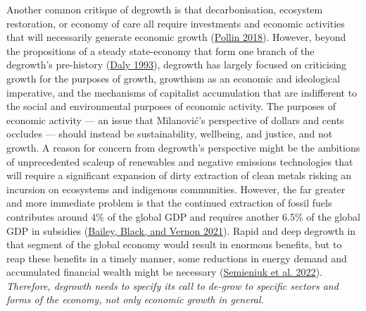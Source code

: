\documentclass[a4paper, nobind]{templates/ociamthesis}
\begin{document}
Another common critique of degrowth is that decarbonisation, ecosystem restoration, or economy of care all require investments and economic activities that will necessarily generate economic growth (\protect\hyperlink{ref-pollin_de-growth_2018}{Pollin 2018}). However, beyond the propositions of a steady state-economy that form one branch of the degrowth's pre-history (\protect\hyperlink{ref-daly_steady-state_1993}{Daly 1993}), degrowth has largely focused on criticising growth for the purposes of growth, growthism as an economic and ideological imperative, and the mechanisms of capitalist accumulation that are indifferent to the social and environmental purposes of economic activity. The purposes of economic activity --- an issue that Milanović's perspective of dollars and cents occludes --- should instead be sustainability, wellbeing, and justice, and not growth. A reason for concern from degrowth's perspective might be the ambitions of unprecedented scaleup of renewables and negative emissions technologies that will require a significant expansion of dirty extraction of clean metals risking an incursion on ecosystems and indigenous communities. However, the far greater and more immediate problem is that the continued extraction of fossil fuels contributes around 4\% of the global GDP and requires another 6.5\% of the global GDP in subsidies (\protect\hyperlink{ref-bailey_still_2021}{Bailey, Black, and Vernon 2021}). Rapid and deep degrowth in that segment of the global economy would result in enormous benefits, but to reap these benefits in a timely manner, some reductions in energy demand and accumulated financial wealth might be necessary (\protect\hyperlink{ref-semieniuk_stranded_2022}{Semieniuk et al. 2022}). \emph{Therefore, degrowth needs to specify its call to de-grow to specific sectors and forms of the economy, not only economic growth in general.}
\end{document}

